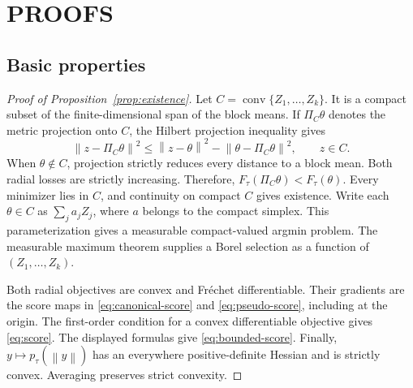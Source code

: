 \documentclass[twoside]{article}
\theoremstyle{definition}
\newcommand{\norm}[1]{\left\lVert #1\right\rVert}
\begin{document}









\appendix


\section{PROOFS}\label{app:proofs}

\subsection{Basic properties}\label{app:proof-basic}

\begin{proof}[Proof of Proposition~\ref{prop:existence}]
Let $C=\operatorname{conv}\{Z_1,\ldots,Z_k\}$. It is a compact subset of the finite-dimensional span of the block means. If $\Pi_C\theta$ denotes the metric projection onto $C$, the Hilbert projection inequality gives
\[
    \norm{z-\Pi_C\theta}^2
    \le \norm{z-\theta}^2-\norm{\theta-\Pi_C\theta}^2,
    \qquad z\in C.
\]
When $\theta\notin C$, projection strictly reduces every distance to a block mean. Both radial losses are strictly increasing. Therefore, $F_\tau(\Pi_C\theta)<F_\tau(\theta)$. Every minimizer lies in $C$, and continuity on compact $C$ gives existence. Write each $\theta\in C$ as $\sum_j a_jZ_j$, where $a$ belongs to the compact simplex. This parameterization gives a measurable compact-valued argmin problem. The measurable maximum theorem supplies a Borel selection as a function of $(Z_1,\ldots,Z_k)$.

Both radial objectives are convex and Fr\'echet differentiable. Their gradients are the score maps in \eqref{eq:canonical-score} and \eqref{eq:pseudo-score}, including at the origin. The first-order condition for a convex differentiable objective gives \eqref{eq:score}. The displayed formulas give \eqref{eq:bounded-score}. Finally, $y\mapsto p_\tau(\norm y)$ has an everywhere positive-definite Hessian and is strictly convex. Averaging preserves strict convexity.
\end{proof}
\end{document}
